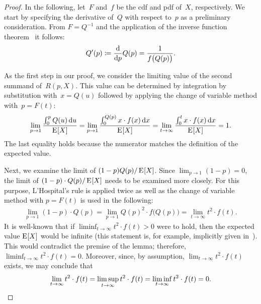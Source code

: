 \begin{proof}
	In the following, let~$F$ and~$f$ be the cdf and pdf of~$X$, respectively.
	We start by specifying the derivative of~$Q$ with respect to~$p$ as a preliminary consideration.
	From $F = Q^{-1}$ and the application of the inverse function theorem~\cite{rudin1964principles} it follows:
	\begin{align}
	\label{eq:quantil_deriv}
		Q'(p) \coloneqq \frac{\D}{\D p} Q(p)=\frac{1}{f\bigl(Q(p)\bigr)}. 
	\end{align}
	
	As the first step in our proof, we consider the limiting value of the second summand of~$R(p,X)$.
	This value can be determined by integration by substitution with~\mbox{$x=Q(u)$} followed by applying the change of variable method with~\mbox{$p=F(t)$}:
	\begin{align*}
		\lim\limits_{p\rightarrow 1}\frac{\integralLow[u]{0}{p}{Q(u)}}{\expectation{X}}
		=\lim\limits_{p\rightarrow 1}\frac{\integralLow{0}{Q(p)}{x\cdot f(x)}}{\expectation{X}}
		=\lim\limits_{t\rightarrow \infty} \frac{\integralLow{0}{t}{x\cdot f(x)}}{\expectation{X}} =1.
	\end{align*}
	The last equality 
	holds %
	because the 
	numerator
	matches the definition of the expected value.
	
	Next, we examine the limit
	of 
	$(1-p)Q(p)/\expectation{X}$.
	Since 
	$\lim_{p \to 1} (1-p) = 0$,
	the limit of \mbox{$(1-p)\cdot Q(p)/\expectation{X}$} needs to be examined 
	more closely.
	For this purpose, L'Hospital's rule is applied twice as well as the change of variable method with \mbox{$p=F(t)$} is used in the following:
	\begin{align*}
		\lim\limits_{p\rightarrow 1} (1-p)\cdot Q(p)
		= \lim\limits_{p\rightarrow 1} Q(p)^2\cdot f\bigl(Q(p)\bigr)
		= \lim\limits_{t\rightarrow \infty} t^2\cdot f(t).
	\end{align*}
	It is well-known that if \mbox{$\liminf_{t\rightarrow \infty} t^2 \cdot f(t) >0$} were to hold, then the expected value $\expectation{X}$ would be infinite (this statement is, for example, implicitly given in~\cite{foss2011introduction}).
	This would contradict the premise of the lemma; therefore, \mbox{$\liminf_{t\rightarrow \infty} t^2 \cdot f(t) = 0$}.
	Moreover, since, by assumption, $\lim_{t\rightarrow\infty} t^2 \cdot f(t)$ exists, we may conclude that 
	\[
	\lim\limits_{t\rightarrow\infty} t^2 \cdot f(t) = \limsup\limits_{t\rightarrow\infty} t^2 \cdot f(t) = \liminf\limits_{t\rightarrow\infty} t^2 \cdot f(t) = 0. \qedhere
	\]
\end{proof}

